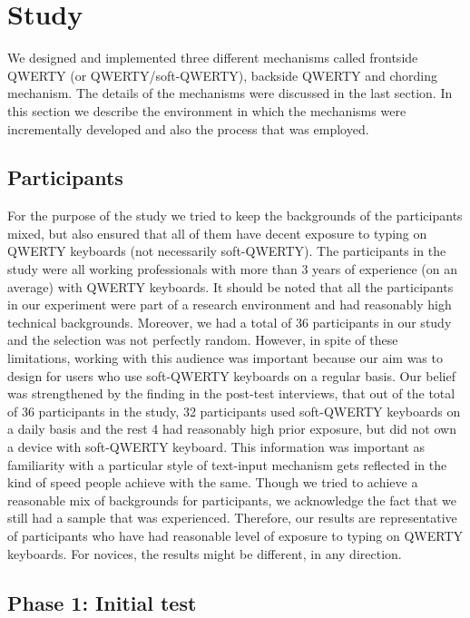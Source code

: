 \section{Study}

We designed and implemented three different mechanisms called frontside QWERTY (or QWERTY/soft-QWERTY), backside QWERTY and chording mechanism. The details of the mechanisms were discussed in the last section. In this section we describe the environment in which the mechanisms were incrementally developed and also the process that was employed. 

\subsection{Participants}

For the purpose of the study we tried to keep the backgrounds of the participants mixed, but also ensured that all of them have decent exposure to typing on QWERTY keyboards (not necessarily soft-QWERTY). The participants in the study were all working professionals with more than 3 years of experience (on an average) with QWERTY keyboards. It should be noted that all the participants in our experiment were part of a research environment and had reasonably high technical backgrounds. Moreover, we had a total of 36 participants in our study and the selection was not perfectly random. However, in spite of these limitations, working with this audience was important because our aim was to design for users who use soft-QWERTY keyboards on a regular basis. Our belief was strengthened by the finding in the post-test interviews, that out of the total of 36 participants in the study, 32 participants used soft-QWERTY keyboards on a daily basis and the rest 4 had reasonably high prior exposure, but did not own a device with soft-QWERTY keyboard. This information was important as familiarity with a particular style of text-input mechanism gets reflected in the kind of speed people achieve with the same. Though we tried to achieve a reasonable mix of backgrounds for participants, we acknowledge the fact that we still had a sample that was experienced. Therefore, our results are representative of participants who have had reasonable level of exposure to typing on QWERTY keyboards. For novices, the results might be different, in any direction.

\subsection{Phase 1: Initial test}

